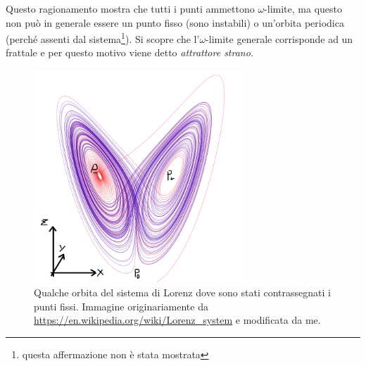 Questo ragionamento mostra che tutti i punti ammettono $\omega$-limite, ma questo non pu\`o in generale essere un punto fisso (sono instabili) o un'orbita periodica (perch\'e assenti dal sistema\footnote{questa affermazione non \`e stata mostrata}). Si scopre che l'$\omega$-limite generale corrisponde ad un frattale e per questo motivo viene detto \textit{attrattore strano}.

\begin{figure}[!htb]
    \centering
    \includegraphics[width=8cm]{Immagini/800px-Lorenz_attractor.png}
    \caption{Qualche orbita del sistema di Lorenz dove sono stati contrassegnati i punti fissi. Immagine originariamente da \url{https://en.wikipedia.org/wiki/Lorenz_system} e modificata da me.}
\end{figure}




